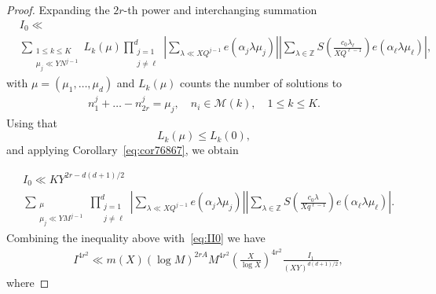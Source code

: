\documentclass[10pt,a4paper]{amsart}
\def\Z{{\mathbb Z}}
\def\cM{{\mathcal M}}
\def\le{\leqslant}
\begin{document}
\begin{proof}
Expanding the $2r$-th power and interchanging summation 
\begin{align*}
&I_0\ll \\ &\sum_{\substack{1\le k \le K\\ \mu_j\ll YN^{j-1}}}L_k(\mu)\prod_{\substack{j=1 \\ j\neq \ell }}^{d}\left|\sum_{\lambda\ll XQ^{j-1}}e(\alpha_j \lambda \mu_j)\right|\left|\sum_{\lambda \in \Z}S\left(\frac{c_0\lambda_{\ell}}{XQ^{\ell-1}}\right)e(\alpha_\ell \lambda \mu_\ell)\right|,
\end{align*}
with $\mu=(\mu_1,\dots,\mu_d)$ and $L_k(\mu)$ counts the number of solutions to 
\begin{align*}
n^{j}_1+\dots-n_{2r}^{j}=\mu_j, \quad n_i\in \cM(k), \quad 1\le k \le K.
\end{align*}
Using that 
$$L_k(\mu)\le L_k(0),$$
and applying Corollary~\ref{eq:cor76867}, we obtain

\begin{align*}
& I_0\ll KY^{2r-d(d+1)/2} \\ & \sum_{\substack{\mu \\ \mu_j \ll YM^{j-1}}}\prod_{\substack{j=1 \\ j\neq \ell }}^{d}\left|\sum_{\lambda \ll XQ^{j-1}}e(\alpha_j \lambda \mu_j)\right|\left|\sum_{\lambda \in \Z}S\left(\frac{c_0\lambda}{Xq^{\ell-1}}\right)e(\alpha_\ell \lambda \mu_\ell)\right|.
\end{align*}
Combining the inequality above with~\eqref{eq:II0} we have 
\begin{align}
\label{eq:II1}
& I^{4r^2}\ll m(X)(\log{M})^{2rA}M^{4r^2}\left(\frac{X}{\log{X}}\right)^{4r^2}\frac{I_1}{(XY)^{d(d+1)/2}},
\end{align}
where 


\end{proof}
\end{document}
